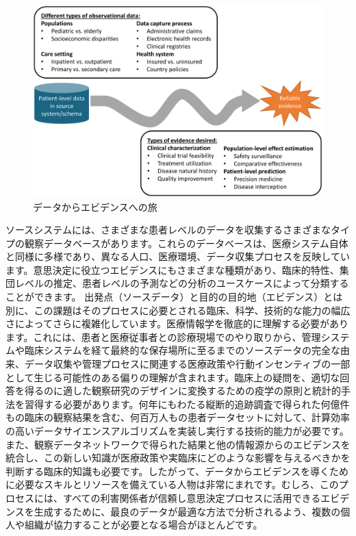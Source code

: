 \documentclass[
  11pt]{book}
\theoremstyle{definition}
\theoremstyle{definition}
\theoremstyle{definition}
\theoremstyle{definition}
\theoremstyle{remark}
\begin{document}
\begin{figure}

{\centering \includegraphics[width=1\linewidth]{images/OhdsiCommunity/datajourney} 

}

\caption{データからエビデンスへの旅}\label{fig:datajourney}
\end{figure}

ソースシステムには、さまざまな患者レベルのデータを収集するさまざまなタイプの観察データベースがあります。これらのデータベースは、医療システム自体と同様に多様であり、異なる人口、医療環境、データ収集プロセスを反映しています。意思決定に役立つエビデンスにもさまざまな種類があり、臨床的特性、集団レベルの推定、患者レベルの予測などの分析のユースケースによって分類することができます。 出発点（ソースデータ）と目的の目的地（エビデンス）とは別に、この課題はそのプロセスに必要とされる臨床、科学、技術的な能力の幅広さによってさらに複雑化しています。医療情報学を徹底的に理解する必要があります。これには、患者と医療従事者との診療現場でのやり取りから、管理システムや臨床システムを経て最終的な保存場所に至るまでのソースデータの完全な由来、データ収集や管理プロセスに関連する医療政策や行動インセンティブの一部として生じる可能性のある偏りの理解が含まれます。臨床上の疑問を、適切な回答を得るのに適した観察研究のデザインに変換するための疫学の原則と統計的手法を習得する必要があります。何年にもわたる縦断的追跡調査で得られた何億件もの臨床の観察結果を含む、何百万人もの患者データセットに対して、計算効率の高いデータサイエンスアルゴリズムを実装し実行する技術的能力が必要です。 また、観察データネットワークで得られた結果と他の情報源からのエビデンスを統合し、この新しい知識が医療政策や実臨床にどのような影響を与えるべきかを判断する臨床的知識も必要です。したがって、データからエビデンスを導くために必要なスキルとリソースを備えている人物は非常にまれです。むしろ、このプロセスには、すべての利害関係者が信頼し意思決定プロセスに活用できるエビデンスを生成するために、最良のデータが最適な方法で分析されるよう、複数の個人や組織が協力することが必要となる場合がほとんどです。
\end{document}
